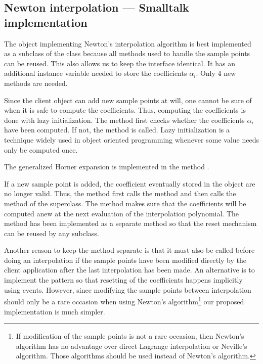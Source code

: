 \subsection{Newton interpolation --- Smalltalk implementation}
 The object implementing Newton's
interpolation algorithm is best implemented as a subclass of the
class  because all methods used to
handle the sample points can be reused. This also allows us to
keep the interface identical. It has an additional instance
variable needed to store the coefficients $\alpha_i$. Only 4 new
methods are needed.

Since the client object can add new sample points at will, one
cannot be sure of when it is safe to compute the coefficients.
Thus, computing the coefficients is done with lazy initialization.
The method  first checks whether the coefficients
$\alpha_i$ have been computed. If not, the method  is called. Lazy initialization is a technique
widely used in object oriented programming whenever some value
needs only be computed once.

\noindent The generalized Horner expansion is implemented in the
method .

If a new sample point is added, the coefficient eventually stored
in the object are no longer valid. Thus, the method 
first calls the method  and then calls the
method  of the superclass. The method  makes sure that the coefficients will be
computed anew at the next evaluation of the interpolation
polynomial. The method  has been
implemented as a separate method so that the reset mechanism can
be reused by any subclass.

Another reason to keep the method  separate
is that it must also be called before doing an interpolation if
the sample points have been modified directly by the client
application after the last interpolation has been made. An
alternative is to implement the 
pattern so that resetting of the coefficients happens implicitly
using events. However, since modifying the sample points between
interpolation should only be a rare occasion when using Newton's
algorithm\footnote{If modification of the sample points is not a
rare occasion, then Newton's algorithm has no advantage over
direct Lagrange interpolation or Neville's algorithm. Those
algorithms should be used instead of Newton's algorithm.} our
proposed implementation is much simpler.

